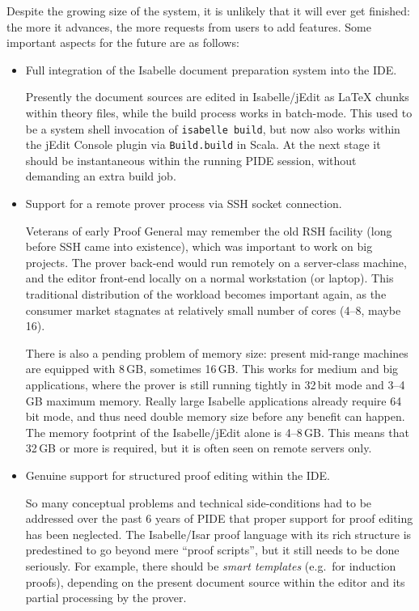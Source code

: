 \begin{isabellebody}
\begin{isamarkuptext}
\medskip Despite the growing size of the system, it is unlikely that it will
ever get finished: the more it advances, the more requests from users to add
features. Some important aspects for the future are as follows:

\begin{itemize}

\item Full integration of the Isabelle document preparation system into the
IDE.

Presently the document sources are edited in Isabelle/jEdit as {\LaTeX}
chunks within theory files, while the build process works in batch-mode.
This used to be a system shell invocation of \verb|isabelle build|,
but now also works within the jEdit Console plugin via \verb|Build.build| in Scala. At the next stage it should be instantaneous within
the running PIDE session, without demanding an extra build job.

\item Support for a remote prover process via SSH socket connection.

Veterans of early Proof General may remember the old RSH facility (long
before SSH came into existence), which was important to work on big
projects. The prover back-end would run remotely on a server-class machine,
and the editor front-end locally on a normal workstation (or laptop). This
traditional distribution of the workload becomes important again, as the
consumer market stagnates at relatively small number of cores (4--8, maybe
16).

There is also a pending problem of memory size: present mid-range machines
are equipped with 8\,GB, sometimes 16\,GB. This works for medium and big
applications, where the prover is still running tightly in 32\,bit mode and
3--4\,GB maximum memory. Really large Isabelle applications already require
64\,bit mode, and thus need double memory size before any benefit can
happen. The memory footprint of the Isabelle/jEdit alone is 4--8\,GB. This
means that 32\,GB or more is required, but it is often seen on remote
servers only.

\item Genuine support for structured proof editing within the IDE.

So many conceptual problems and technical side-conditions had to be
addressed over the past 6 years of PIDE that proper support for proof
editing has been neglected. The Isabelle/Isar proof language with its rich
structure is predestined to go beyond mere ``proof scripts'', but it still
needs to be done seriously. For example, there should be \emph{smart
templates} (e.g.\ for induction proofs), depending on the present document
source within the editor and its partial processing by the prover.


\end{itemize}
\end{isamarkuptext}
\end{isabellebody}
